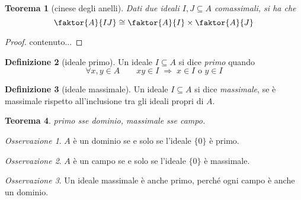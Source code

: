 \documentclass[a4paper]{article}
\newtheorem{theorem}{Teorema}[section]
\theoremstyle{remark}
\newtheorem*{remark}{Osservazione}
\theoremstyle{definition}
\newtheorem{definition}[theorem]{Definizione}
\begin{document}
\begin{multicols}{2}
\begin{theorem}[cinese degli anelli]
	Dati due ideali $ I, J \subseteq A $ comassimali, si ha che
	\[ \faktor{A}{IJ} \cong \faktor{A}{I} \times \faktor{A}{J} \]
\end{theorem}
\begin{proof}
	contenuto...
\end{proof}

\begin{definition}[ideale primo]
	Un ideale $ I \subseteq A $ si dice \emph{primo} quando
	\[ \forall x, y \in A \qquad xy \in I \;\Rightarrow\; x \in I \text{ o } y \in I \]
\end{definition}

\begin{definition}[ideale massimale]
	Un ideale $ I \subseteq A $ si dice \emph{massimale}, se è massimale rispetto all'inclusione tra gli ideali propri di $ A $.
\end{definition}

\begin{theorem}
	primo sse dominio, massimale sse campo.
\end{theorem}

\begin{remark}
	$ A $ è un dominio se e solo se l'ideale $ \{0\} $ è primo.
\end{remark}
\begin{remark}
	$ A $ è un campo se e solo se l'ideale $ \{0\} $ è massimale.
\end{remark}
\begin{remark}
	Un ideale massimale è anche primo, perché ogni campo è anche un dominio.
\end{remark}


\end{multicols}



\end{document}

